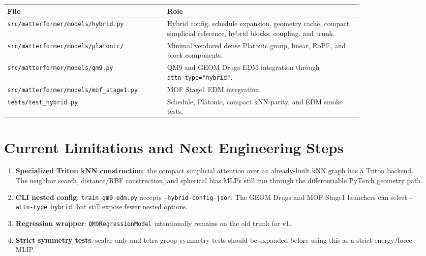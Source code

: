 \documentclass[11pt]{article}
\begin{document}
\begin{center}
\begin{tabular}{p{0.37\linewidth}p{0.47\linewidth}}
\toprule
File & Role \\
\midrule
\texttt{src/matterformer/models/hybrid.py} &
Hybrid config, schedule expansion, geometry cache, compact simplicial reference,
hybrid blocks, coupling, and trunk. \\
\texttt{src/matterformer/models/platonic/} &
Minimal vendored dense Platonic group, linear, RoPE, and block components. \\
\texttt{src/matterformer/models/qm9.py} &
QM9 and GEOM Drugs EDM integration through \texttt{attn\_type="hybrid"}. \\
\texttt{src/matterformer/models/mof\_stage1.py} &
MOF Stage1 EDM integration. \\
\texttt{tests/test\_hybrid.py} &
Schedule, Platonic, compact kNN parity, and EDM smoke tests. \\
\bottomrule
\end{tabular}
\end{center}

\section{Current Limitations and Next Engineering Steps}

\begin{enumerate}[leftmargin=1.5em]
  \item \textbf{Specialized Triton kNN construction}: the compact
  simplicial attention over an already-built kNN graph has a Triton backend.
  The neighbor search, distance/RBF construction, and spherical bias MLPs still
  run through the differentiable PyTorch geometry path.

  \item \textbf{CLI nested config}: \texttt{train\_qm9\_edm.py} accepts
  \texttt{--hybrid-config-json}.  The GEOM Drugs and MOF Stage1 launchers can
  select \texttt{--attn-type hybrid}, but still expose fewer nested options.

  \item \textbf{Regression wrapper}: \texttt{QM9RegressionModel} intentionally
  remains on the old trunk for v1.

  \item \textbf{Strict symmetry tests}: scalar-only and tetra-group symmetry
  tests should be expanded before using this as a strict energy/force MLIP.
\end{enumerate}
\end{document}
